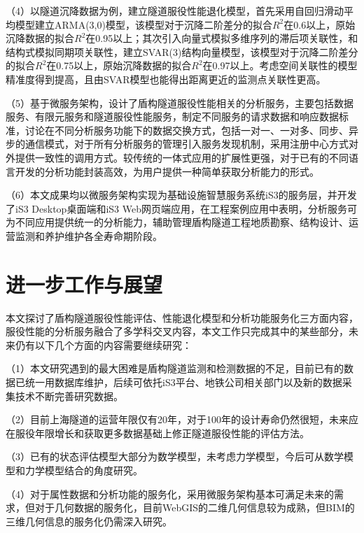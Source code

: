 （4）以隧道沉降数据为例，建立隧道服役性能退化模型，首先采用自回归滑动平均模型建立ARMA(3,0)模型，该模型对于沉降二阶差分的拟合$R^2$在0.6以上，原始沉降数据的拟合$R^2$在0.95以上；其次引入向量式模拟多维序列的滞后项关联性，和结构式模拟同期项关联性，建立SVAR(3)结构向量模型，该模型对于沉降二阶差分的拟合$R^2$在0.75以上，原始沉降数据的拟合$R^2$在0.97以上。考虑空间关联性的模型精准度得到提高，且由SVAR模型也能得出距离更近的监测点关联性更高。

（5）基于微服务架构，设计了盾构隧道服役性能相关的分析服务，主要包括数据服务、有限元服务和隧道服役性能服务，制定不同服务的请求数据和响应数据标准，讨论在不同分析服务功能下的数据交换方式，包括一对一、一对多、同步、异步的通信模式，对于所有分析服务的管理引入服务发现机制，采用注册中心方式对外提供一致性的调用方式。较传统的一体式应用的扩展性更强，对于已有的不同语言开发的分析功能封装高效，为用户提供一种简单获取分析能力的形式。

（6）本文成果均以微服务架构实现为基础设施智慧服务系统iS3的服务层，并开发了iS3 Desktop桌面端和iS3 Web网页端应用，在工程案例应用中表明，分析服务可为不同应用提供统一的分析能力，辅助管理盾构隧道工程地质勘察、结构设计、运营监测和养护维护各全寿命期阶段。

\section{进一步工作与展望}

本文探讨了盾构隧道服役性能评估、性能退化模型和分析功能服务化三方面内容，服役性能的分析服务融合了多学科交叉内容，本文工作只完成其中的某些部分，未来仍有以下几个方面的内容需要继续研究：

（1）本文研究遇到的最大困难是盾构隧道监测和检测数据的不足，目前已有的数据已统一用数据库维护，后续可依托iS3平台、地铁公司相关部门以及新的数据采集技术不断完善研究数据。

（2）目前上海隧道的运营年限仅有20年，对于100年的设计寿命仍然很短，未来应在服役年限增长和获取更多数据基础上修正隧道服役性能的评估方法。

（3）已有的状态评估模型大部分为数学模型，未考虑力学模型，今后可从数学模型和力学模型结合的角度研究。

（4）对于属性数据和分析功能的服务化，采用微服务架构基本可满足未来的需求，但对于几何数据的服务化，目前WebGIS的二维几何信息较为成熟，但BIM的三维几何信息的服务化仍需深入研究。